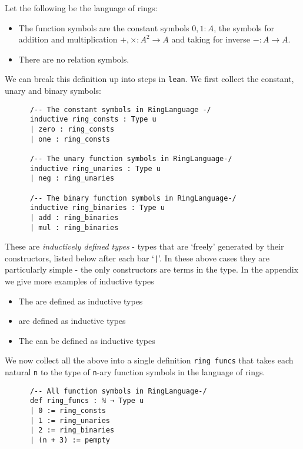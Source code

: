 \begin{dfn}
    Let the following be the language of rings:
    \begin{itemize}
        \item The function symbols are the constant symbols $0, 1 : A$,
        the symbols for addition and multiplication $+ , \times : A^2 \to A$
        and taking for inverse $- : A \to A$.
        \item There are no relation symbols.
    \end{itemize}

    We can break this definition up into steps in \texttt{lean}.
    We first collect the constant, unary and binary symbols:

    \begin{lstlisting}
      /-- The constant symbols in RingLanguage -/
      inductive ring_consts : Type u
      | zero : ring_consts
      | one : ring_consts

      /-- The unary function symbols in RingLanguage-/
      inductive ring_unaries : Type u
      | neg : ring_unaries

      /-- The binary function symbols in RingLanguage-/
      inductive ring_binaries : Type u
      | add : ring_binaries
      | mul : ring_binaries\end{lstlisting}

    These are \textit{inductively defined types} -
    types that are `freely' generated by their constructors,
    listed below after each bar `\texttt{|}'.
    In these above cases they are particularly simple -
    the only constructors are terms in the type.
    In the appendix we give more examples of inductive types %
    \begin{itemize}
      \item The  are defined as inductive types
      \item {} are defined as inductive types
      \item The  can be defined as inductive types
    \end{itemize}

    We now collect all the above into a single definition \texttt{ring funcs}
    that takes each natural \texttt{n} to the type of \texttt{n}-ary
    function symbols in the language of rings.

    \begin{lstlisting}
      /-- All function symbols in RingLanguage-/
      def ring_funcs : ℕ → Type u
      | 0 := ring_consts
      | 1 := ring_unaries
      | 2 := ring_binaries
      | (n + 3) := pempty\end{lstlisting}


\end{dfn}
